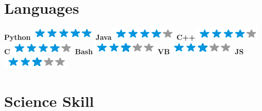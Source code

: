 \begin{aside}
	~
	~
	~
	~
	~
	~
	~
	~
	~
	~
	~
    \section{Languages}
    \textbf{Python}\includegraphics[scale=0.40]{img/5stars.png}
    \textbf{Java}\includegraphics[scale=0.40]{img/4stars.png}
    \textbf{C++}\includegraphics[scale=0.40]{img/4stars.png}
    \textbf{C}\includegraphics[scale=0.40]{img/4stars.png}
    \textbf{Bash}\includegraphics[scale=0.40]{img/3stars.png}
    \textbf{VB}\includegraphics[scale=0.40]{img/3stars.png}
    \textbf{JS}\includegraphics[scale=0.40]{img/3stars.png}
    ~
	~
	~
	~
	~
	~
	~
	~
	~
	~
	~
    \section{Science Skill}
    ~
    ~
    ~
\end{aside}
